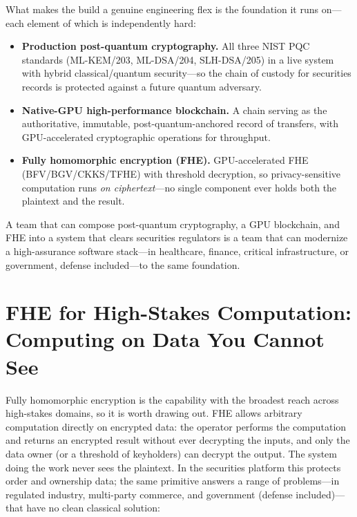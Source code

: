 \documentclass[11pt,letterpaper]{article}
\begin{document}
What makes the build a genuine engineering flex is the foundation it runs on---
each element of which is independently hard:

\begin{itemize}
  \item \textbf{Production post-quantum cryptography.} All three NIST PQC
  standards (ML-KEM/203, ML-DSA/204, SLH-DSA/205) in a live system with hybrid
  classical/quantum security---so the chain of custody for securities records is
  protected against a future quantum adversary.
  \item \textbf{Native-GPU high-performance blockchain.} A chain serving as the
  authoritative, immutable, post-quantum-anchored record of transfers, with
  GPU-accelerated cryptographic operations for throughput.
  \item \textbf{Fully homomorphic encryption (FHE).} GPU-accelerated FHE
  (BFV/BGV/CKKS/TFHE) with threshold decryption, so privacy-sensitive computation
  runs \emph{on ciphertext}---no single component ever holds both the plaintext
  and the result.
\end{itemize}

A team that can compose post-quantum cryptography, a GPU blockchain, and FHE into
a system that clears securities regulators is a team that can modernize a
high-assurance software stack---in healthcare, finance, critical infrastructure,
or government, defense included---to the same foundation.

\section{FHE for High-Stakes Computation: Computing on Data You Cannot See}

Fully homomorphic encryption is the capability with the broadest reach across
high-stakes domains, so it is worth drawing out. FHE allows arbitrary computation
directly on encrypted
data: the operator performs the computation and returns an encrypted result
without ever decrypting the inputs, and only the data owner (or a threshold of
keyholders) can decrypt the output. The system doing the work never sees the
plaintext. In the securities platform this protects order and ownership data; the
same primitive answers a range of problems---in regulated industry, multi-party
commerce, and government (defense included)---that have no clean classical
solution:
\end{document}
